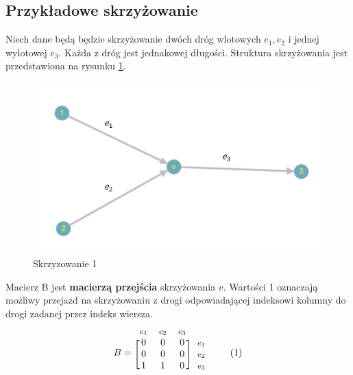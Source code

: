\documentclass[12pt]{book}
\newcommand\addtag{\refstepcounter{equation}
\tag{\theequation}}
\begin{document}
\subsection{Przykładowe skrzyżowanie}
Niech dane będą będzie skrzyżowanie dwóch dróg wlotowych $e_1,e_2$ i jednej wylotowej $e_3$. Każda z dróg jest jednakowej długości. Struktura skrzyżowania jest przedstawiona na rysunku \ref{fig:skrz_1}.
\begin{figure}[H]
  \centering
    \includegraphics[width=14cm]{skrz_1}
 \caption{Skrzyzowanie 1}
 \label{fig:skrz_1}
\end{figure}
Macierz B jest \textbf{macierzą przejścia} skrzyżowania $v$. Wartości 1 oznaczają możliwy przejazd na skrzyżowaniu z drogi odpowiadającej indeksowi kolumny do drogi zadanej przez indeks wiersza.
\begin{equation*}
  B=
  \begin{blockarray}{*{3}{c} l}
    \begin{block}{*{3}{>{$\footnotesize}c<{$}} l}
     $e_1$ & $e_2$ & $e_3$\\
    \end{block}
    \begin{block}{[*{3}{c}]>{$\footnotesize}l<{$}}
       0 & 0 & 0 & $e_1$ \\
       0 & 0 & 0 & $e_2$ \\
       1 & 1 & 0 & $e_3$ \\
    \end{block}
  \end{blockarray} \addtag
\end{equation*}
\end{document}
